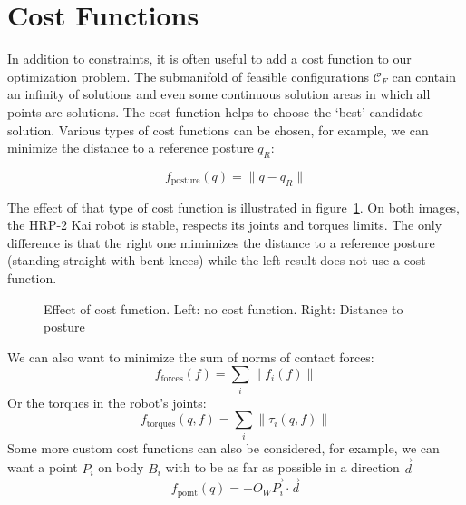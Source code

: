 \section{Cost Functions}
\label{sec:cost_functions}


In addition to constraints, it is often useful to add a cost function to our optimization problem.
The submanifold of feasible configurations $\mathcal{C}_F$ can contain an infinity of solutions and even some continuous solution areas in which all points are solutions.
The cost function helps to choose the `best' candidate solution.
Various types of cost functions can be chosen, for example, we can minimize the distance to a reference posture $q_R$:

\begin{equation*}
  f_\text{posture}(q) = \|q-q_R\|
\end{equation*}

The effect of that type of cost function is illustrated in figure~\ref{fig:cost}. On both images, the HRP-2 Kai robot is stable, respects its joints and torques limits. The only difference is that the right one mimimizes the distance to a reference posture (standing straight with bent knees) while the left result does not use a cost function.

\begin{figure}[htpb]
  \centering
  \setlength{\fboxsep}{0pt}%
  \setlength{\fboxrule}{1pt}%
  \caption{Effect of cost function. Left: no cost function. Right: Distance to posture}
\label{fig:cost}
\end{figure}

We can also want to minimize the sum of norms of contact forces:
\begin{equation*}
  f_\text{forces}(f) = \sum\limits_i \|f_i(f)\|
\end{equation*}
Or the torques in the robot's joints:
\begin{equation*}
  f_\text{torques}(q,f) = \sum\limits_i \|\tau_i(q,f)\|
\end{equation*}
Some more custom cost functions can also be considered, for example, we can want a point $P_i$ on body $B_i$ with to be as far as possible in a direction $\vec{d}$
\begin{equation*}
  f_\text{point} (q) = -{\overrightarrow{O_W P_i}}\cdot{\vec{d}}
\end{equation*}

